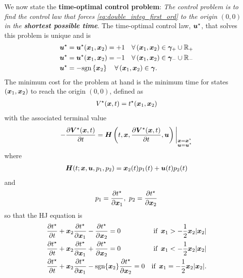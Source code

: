 %
%
We now state the \textbf{time-optimal control problem}: \textit{The control problem is to find the control law that forces \eqref{eq:double_integ_first_ord} to the origin $\left(0,0\right)$ in the \textbf{shortest possible time}}. The time-optimal control law, $\bm{u}^\star$, that solves this problem is unique and is
%
\begin{align}
	\bm{u}^\star &= \bm{u}^\star(\bm{x}_1, \bm{x}_2) = +1 \quad \forall \left(\bm{x}_1, \bm{x}_2\right) \in \bm{\gamma}_+ \cup \mathbb{R}_+ \nonumber \\
	\bm{u}^\star &= \bm{u}^\star(\bm{x}_1, \bm{x}_2) = -1 \quad \forall \left(\bm{x}_1, \bm{x}_2\right) \in \bm{\gamma}_- \cup \mathbb{R}_-  \\
	\bm{u}^\star &= -\text{sgn} \left\{\bm{x}_2\right\} \quad \forall \left(\bm{x}_1, \bm{x}_2\right) \in \bm{\gamma}. \nonumber
\end{align}
%
The minimum cost for the problem at hand is the minimum time for states $(\bm{x}_1, \bm{x}_2)$ to reach the origin $(0, 0)$, defined as 
%
\begin{align}
	V^\star(\bm{x}, t) = t^\star(\bm{x}_1, \bm{x}_2)
\end{align}
%
with the associated terminal value
%
\begin{align}
	-\dfrac{\partial \bm{V}^\star (\bm{x}, t)}{\partial t} = \bm{H}\left(t, \bm{x}, \dfrac{\partial \bm{V}^\star (\bm{x}, t)}{\partial t}, \bm{u} \right)\bigg\rvert_{\substack{\bm{x}=\bm{x}^\star\\ \bm{u}=\bm{u}^\star}}
\end{align}
%
where 
%
\begin{align}
	\bm{H}(t; \bm{x}, \bm{u}, p_1, p_2) = \bm{x}_2(t) p_1(t) + \bm{u}(t)p_2(t)
\end{align}
%
and 
%
\begin{align}
	p_1 = \dfrac{\partial t^\star}{\partial \bm{x}_1}, \,\, 
	p_2 = \dfrac{\partial t^\star}{\partial \bm{x}_2}
\end{align}
%
so that the HJ equation is
%
\begin{align}
	\dfrac{\partial t^\star}{\partial t} &+ \state_2 \dfrac{\partial t^\star}{\partial \state_1} - \dfrac{\partial t^\star}{\partial \state_2} = 0 & \text{if }  \, \state_1 > -\dfrac{1}{2} \state_2 |\state_2|  \nonumber \\
	\dfrac{\partial t^\star}{\partial t} &+ \state_2 \dfrac{\partial t^\star}{\partial \state_1} + \dfrac{\partial t^\star}{\partial \state_2} = 0  & \text{if }  \, \state_1 < -\dfrac{1}{2} \state_2 |\state_2|  \nonumber \\
	\dfrac{\partial t^\star}{\partial t} &+ \state_2 \dfrac{\partial t^\star}{\partial \state_1} - \text{sgn}\{\state_2\} \dfrac{\partial t^\star}{\partial \state_2} = 0  & \text{if }  \, \state_1 = -\dfrac{1}{2} \state_2 |\state_2|.  
	\label{eq:dint_time_optimal}
\end{align}
